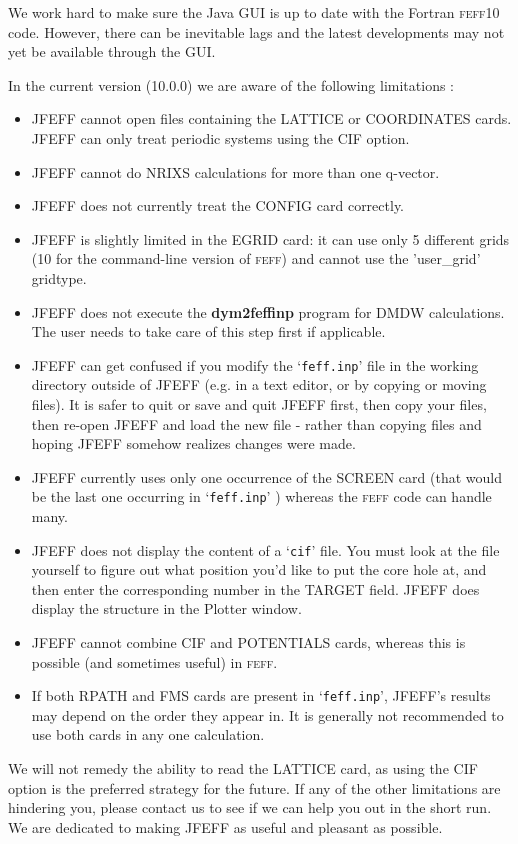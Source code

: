 \documentclass[11pt,oneside]{report} %
\newcommand{\program}[1]{\textsc{#1}}
\newcommand{\feff}{\program{feff}}
\newcommand{\vnum}{10}
\newcommand{\feffcur}{\feff\vnum}
\newcommand{\file}[1]{`\texttt{#1}'}
\newcommand{\module}[1]{\textrm{\bf{#1}}}
\begin{document}
We work hard to make sure the Java GUI is up to date with the Fortran {\feffcur} code.  However, there can be inevitable lags and the latest developments may not yet be available through the GUI.

In the current version (10.0.0) we are aware of the following limitations :
\begin{itemize}  \tightlist
\item  JFEFF cannot open files containing the LATTICE or COORDINATES cards.  JFEFF can only treat periodic systems using the CIF option.
\item  JFEFF cannot do NRIXS calculations for more than one q-vector.
\item  JFEFF does not currently treat the CONFIG card correctly.
\item  JFEFF is slightly limited in the EGRID card: it can use only 5 different grids (10 for the command-line version of {\feff}) and cannot use the 'user\_grid' gridtype.
\item  JFEFF does not execute the \module{dym2feffinp} program for DMDW calculations.  The user needs to take care of this step first if applicable.
\item  JFEFF can get confused if you modify the \file{feff.inp} file in the working directory outside of JFEFF (e.g. in a text editor, or by copying or moving files).  It is safer to quit or save and quit JFEFF first, then copy your files, then re-open JFEFF and load the new file - rather than copying files and hoping JFEFF somehow realizes changes were made.
\item  JFEFF currently uses only one occurrence of the SCREEN card (that would be the last one occurring in \file{feff.inp} ) whereas the {\feff} code can handle many.
\item  JFEFF does not display the content of a \file{cif} file.  You must look at the file yourself to figure out what position you'd like to put the core hole at, and then enter the corresponding number in the TARGET field.  JFEFF does display the structure in the Plotter window.
\item  JFEFF cannot combine CIF and POTENTIALS cards, whereas this is possible (and sometimes useful) in {\feff}.
\item If both RPATH and FMS cards are present in \file{feff.inp}, JFEFF's results may depend on the order they appear in.  It is generally not recommended to use both cards in any one calculation.
\end{itemize}

We will not remedy the ability to read the LATTICE card, as using the CIF option is the preferred strategy for the future.  If any of the other limitations are hindering you, please contact us to see if we can help you out in the short run.  We are dedicated to making JFEFF as useful and pleasant as possible.
\end{document}
